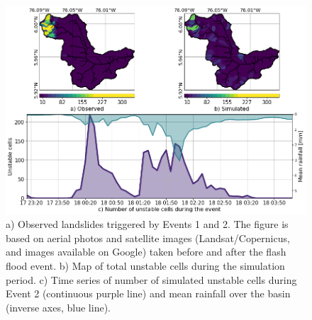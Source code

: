 \documentclass[hess, manuscript]{copernicus}
\providecommand{\DIFadd}[1]{{\protect\color{blue}\uwave{#1}}} %
\providecommand{\DIFaddFL}[1]{\DIFadd{#1}} %
\providecommand{\DIFaddbeginFL}{} %
\providecommand{\DIFaddendFL}{} %
\begin{document}
\begin{figure}[t!]
\centering
 \includegraphics[width=12cm]{Figures/Slides_byHills.png}
 \caption{a) Observed landslides triggered by Events 1 and 2. The figure is based on aerial photos and satellite images (Landsat/Copernicus, and images available on Google) taken before and after the flash flood event. b) Map of total unstable cells during the simulation period. c) Time series of \DIFaddbeginFL \DIFaddFL{the }\DIFaddendFL number of simulated unstable cells during Event 2 (continuous purple line) and mean rainfall over the basin (inverse axes, blue line).}
    \label{fig:SlidesComparison}
\end{figure}
\end{document}
